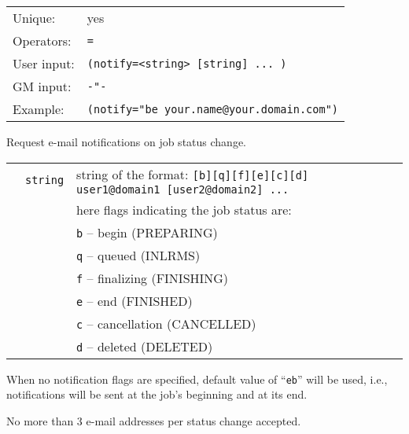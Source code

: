   \hspace*{0.5cm}
  \begin{shaded}
  \end{shaded}
  \begin{tabular}{lp{13cm}}
    Unique:&yes\\
    Operators:&\verb#=#\\
    User input:&\verb#(notify=<string> [string] ... )#\\
    GM input:&\verb#-"-#\\
    Example:&\verb#(notify="be your.name@your.domain.com")#\\
  \end{tabular}

  Request e-mail notifications on job status change.

  \begin{tabular}{llp{10cm}}
    \hspace*{1cm}&\texttt{string} & string of the format:
    \verb#[b][q][f][e][c][d] user1@domain1 [user2@domain2] ...#\\
    \hspace*{1cm}&&here flags indicating the job status are:\\
    \hspace*{1cm}&&\texttt{b} -- begin (PREPARING)\\
    \hspace*{1cm}&&\texttt{q} -- queued (INLRMS)\\
    \hspace*{1cm}&&\texttt{f} -- finalizing (FINISHING)\\
    \hspace*{1cm}&&\texttt{e} -- end (FINISHED)\\
    \hspace*{1cm}&&\texttt{c} -- cancellation (CANCELLED)\\
    \hspace*{1cm}&&\texttt{d} -- deleted (DELETED)\\
  \end{tabular}

  When no notification flags are specified, default value of ``\verb#eb#''
  will be used, i.e., notifications will be sent at the job's beginning
  and at its end.

  No more than 3 e-mail addresses per status change accepted.

